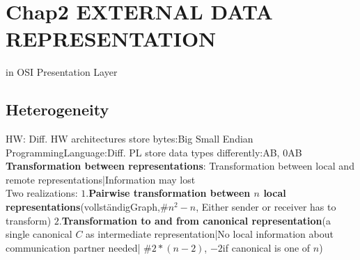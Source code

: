 \section{Chap2 EXTERNAL DATA REPRESENTATION} in OSI Presentation Layer
\subsection*{Heterogeneity}
HW: Diff. HW architectures store bytes:Big Small Endian
ProgrammingLanguage:Diff. PL store data types differently:AB, 0AB \\
\textbf{Transformation between representations}: Transformation between local and remote representations|Information may lost
\\Two realizations:
$1.$\textbf{Pairwise transformation between $n$ local representations}(vollständigGraph,$\#n^2 - n$, Either sender or receiver has to transform) 
$2.$\textbf{Transformation to and from canonical representation}(a single canonical $C$ as intermediate representation|No local information about communication
partner needed| $\#2*(n-2)$, $ -2$if canonical is one of $n$)